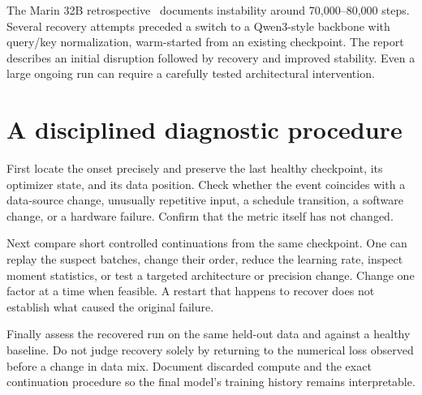 
The Marin 32B retrospective~\cite{marinspikes} documents instability around 70,000--80,000 steps. Several recovery attempts preceded a switch to a Qwen3-style backbone with query/key normalization, warm-started from an existing checkpoint. The report describes an initial disruption followed by recovery and improved stability. Even a large ongoing run can require a carefully tested architectural intervention.


\section{A disciplined diagnostic procedure}
First locate the onset precisely and preserve the last healthy checkpoint, its optimizer state, and its data position. Check whether the event coincides with a data-source change, unusually repetitive input, a schedule transition, a software change, or a hardware failure. Confirm that the metric itself has not changed.

Next compare short controlled continuations from the same checkpoint. One can replay the suspect batches, change their order, reduce the learning rate, inspect moment statistics, or test a targeted architecture or precision change. Change one factor at a time when feasible. A restart that happens to recover does not establish what caused the original failure.

Finally assess the recovered run on the same held-out data and against a healthy baseline. Do not judge recovery solely by returning to the numerical loss observed before a change in data mix. Document discarded compute and the exact continuation procedure so the final model's training history remains interpretable.

\FloatBarrier
